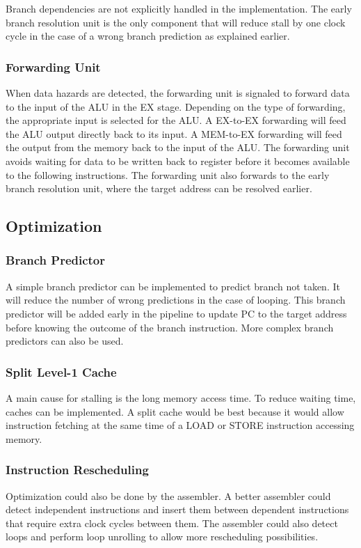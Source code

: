 \documentclass[conference]{IEEEtran}
\begin{document}
Branch dependencies are not explicitly handled in the implementation. The early branch resolution unit is the only component that will reduce stall by one clock cycle  in the case of a wrong branch prediction as explained earlier.

\subsubsection{Forwarding Unit}
When data hazards are detected, the forwarding unit is signaled to forward data to the input of the ALU in the EX stage. Depending on the type of forwarding, the appropriate input is selected for the ALU.  A EX-to-EX forwarding will feed the ALU output directly back to its input. A MEM-to-EX forwarding will feed the output from the memory back to the input of the ALU. The forwarding unit avoids waiting for data to be written back to register before it becomes available to the following instructions. The forwarding unit also forwards to the early branch resolution unit, where the target address can be resolved earlier.

\subsection{Optimization}

\subsubsection{Branch Predictor}
A simple branch predictor can be implemented to predict branch not taken. It will reduce the number of wrong predictions in the case of looping. This branch predictor will be added early in the pipeline to update PC to the target address before knowing the outcome of the branch instruction. More complex branch predictors can also be used.

\subsubsection{Split Level-1 Cache}
A main cause for stalling is the long memory access time. To reduce waiting time, caches can be implemented. A split cache would be best because it would allow instruction fetching at the same time of a LOAD or STORE instruction accessing memory.

\subsubsection{Instruction Rescheduling}
Optimization could also be done by the assembler. A better assembler could detect independent instructions and insert them between dependent instructions that require extra clock cycles between them. The assembler could also detect loops and perform loop unrolling to allow more rescheduling possibilities.
\end{document}
